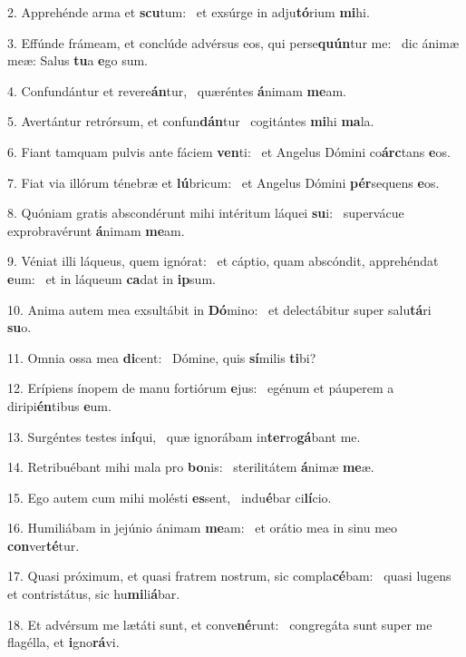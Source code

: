 2. Apprehénde arma et \textbf{scu}tum: \ast\  et exsúrge in adju\textbf{tó}rium \textbf{mi}hi.\

3. Effúnde frámeam, et conclúde advérsus eos, qui perse\textbf{quún}tur me: \ast\  dic ánimæ meæ: Salus \textbf{tu}a \textbf{e}go sum.\

4. Confundántur et revere\textbf{án}tur, \ast\  quæréntes \textbf{á}nimam \textbf{me}am.\

5. Avertántur retrórsum, et confun\textbf{dán}tur \ast\  cogitántes \textbf{mi}hi \textbf{ma}la.\

6. Fiant tamquam pulvis ante fáciem \textbf{ven}ti: \ast\  et Angelus Dómini co\textbf{árc}tans \textbf{e}os.\

7. Fiat via illórum ténebræ et \textbf{lú}bricum: \ast\  et Angelus Dómini \textbf{pér}sequens \textbf{e}os.\

8. Quóniam gratis abscondérunt mihi intéritum láquei \textbf{su}i: \ast\  supervácue exprobravérunt \textbf{á}nimam \textbf{me}am.\

9. Véniat illi láqueus, quem ignórat: \dag\  et cáptio, quam abscóndit, apprehéndat \textbf{e}um: \ast\  et in láqueum \textbf{ca}dat in \textbf{ip}sum.\

10. Anima autem mea exsultábit in \textbf{Dó}mino: \ast\  et delectábitur super salu\textbf{tá}ri \textbf{su}o.\

11. Omnia ossa mea \textbf{di}cent: \ast\  Dómine, quis \textbf{sí}milis \textbf{ti}bi?\

12. Erípiens ínopem de manu fortiórum \textbf{e}jus: \ast\  egénum et páuperem a diripi\textbf{én}tibus \textbf{e}um.\

13. Surgéntes testes in\textbf{í}qui, \ast\  quæ ignorábam in\textbf{ter}ro\textbf{gá}bant me.\

14. Retribuébant mihi mala pro \textbf{bo}nis: \ast\  sterilitátem \textbf{á}nimæ \textbf{me}æ.\

15. Ego autem cum mihi molésti \textbf{es}sent, \ast\  indu\textbf{é}bar ci\textbf{lí}cio.\

16. Humiliábam in jejúnio ánimam \textbf{me}am: \ast\  et orátio mea in sinu meo \textbf{con}ver\textbf{té}tur.\

17. Quasi próximum, et quasi fratrem nostrum, sic compla\textbf{cé}bam: \ast\  quasi lugens et contristátus, sic hu\textbf{mi}li\textbf{á}bar.\

18. Et advérsum me lætáti sunt, et conve\textbf{né}runt: \ast\  congregáta sunt super me flagélla, et \textbf{i}gno\textbf{rá}vi.\

